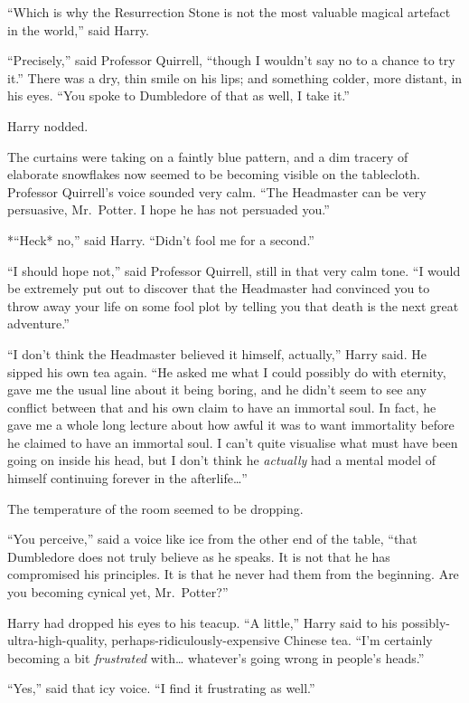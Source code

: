 ``Which is why the Resurrection Stone is not the most valuable magical
artefact in the world,'' said Harry.

``Precisely,'' said Professor Quirrell, ``though I wouldn't say no to a
chance to try it.'' There was a dry, thin smile on his lips; and
something colder, more distant, in his eyes. ``You spoke to Dumbledore
of that as well, I take it.''

Harry nodded.

The curtains were taking on a faintly blue pattern, and a dim tracery of
elaborate snowflakes now seemed to be becoming visible on the
tablecloth. Professor Quirrell's voice sounded very calm. ``The
Headmaster can be very persuasive, Mr.~Potter. I hope he has not
persuaded you.''

*``Heck* no,'' said Harry. ``Didn't fool me for a second.''

``I should hope not,'' said Professor Quirrell, still in that very calm
tone. ``I would be extremely put out to discover that the Headmaster had
convinced you to throw away your life on some fool plot by telling you
that death is the next great adventure.''

``I don't think the Headmaster believed it himself, actually,'' Harry
said. He sipped his own tea again. ``He asked me what I could possibly
do with eternity, gave me the usual line about it being boring, and he
didn't seem to see any conflict between that and his own claim to have
an immortal soul. In fact, he gave me a whole long lecture about how
awful it was to want immortality before he claimed to have an immortal
soul. I can't quite visualise what must have been going on inside his
head, but I don't think he \emph{actually} had a mental model of himself
continuing forever in the afterlife\ldots{}''

The temperature of the room seemed to be dropping.

``You perceive,'' said a voice like ice from the other end of the table,
``that Dumbledore does not truly believe as he speaks. It is not that he
has compromised his principles. It is that he never had them from the
beginning. Are you becoming cynical yet, Mr.~Potter?''

Harry had dropped his eyes to his teacup. ``A little,'' Harry said to
his possibly-ultra-high-quality, perhaps-ridiculously-expensive Chinese
tea. ``I'm certainly becoming a bit \emph{frustrated} with\ldots{}
whatever's going wrong in people's heads.''

``Yes,'' said that icy voice. ``I find it frustrating as well.''

